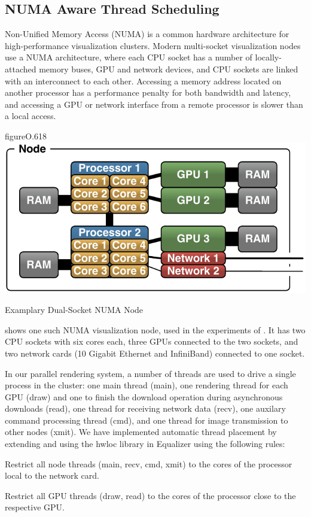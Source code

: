 \subsection{NUMA Aware Thread Scheduling}

Non-Unified Memory Access (NUMA) is a common hardware architecture for
high-performance visualization clusters. Modern multi-socket visualization
nodes use a NUMA architecture, where each CPU socket has a number of
locally-attached memory buses, GPU and network devices, and CPU sockets are
linked with an interconnect to each other. Accessing a memory address located
on another processor has a performance penalty for both bandwidth and latency,
and accessing a GPU or network interface from a remote processor is slower than
a local access.

\begin{wrapfloat}{figure}{O}{.618\textwidth}
 \includegraphics[width=.618\textwidth]{images/numaNode.pdf}
 {\caption{\label{fNumaNode}Examplary Dual-Socket NUMA Node}}
\end{wrapfloat}

 shows one such NUMA visualization node, used in the experiments
of \cite{EBAHMP:12}. It has two CPU sockets with six cores each, three GPUs
connected to the two sockets, and two network cards (10 Gigabit Ethernet and
InfiniBand) connected to one socket.

In our parallel rendering system, a number of threads are used to drive a
single process in the cluster: one main thread (main), one rendering thread for
each GPU (draw) and one to finish the download operation during asynchronous
downloads (read), one thread for receiving network data (recv), one auxilary
command processing thread (cmd), and one thread for image transmission to other
nodes (xmit). We have implemented automatic thread placement by extending and
using the hwloc library in Equalizer using the following rules:

\begin{compactitem}

\item Restrict all node threads (main, recv, cmd, xmit) to the cores of the
processor local to the network card.

\item Restrict all GPU threads (draw, read) to the cores of the processor close
to the respective GPU.

\end{compactitem}

